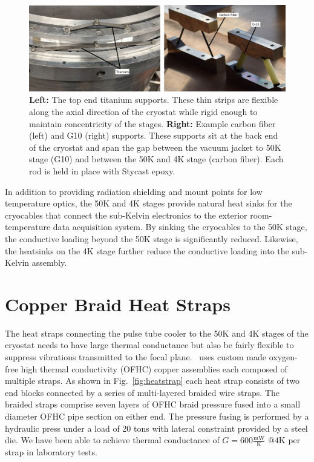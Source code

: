 \documentclass[]{spie}  %
\begin{document}
\begin{figure}[b]
	\center
	\includegraphics{supports.png}
	\caption{\textbf{Left:} The top end titanium supports. These thin strips
	are flexible along the axial direction of the cryostat while rigid enough
	to maintain concentricity of the stages. \textbf{Right:} Example carbon fiber (left) and G10 (right) supports. These
	supports sit at the back end of the cryostat and span the gap between the
	vacuum jacket to 50K stage (G10) and between the 50K and 4K stage (carbon
	fiber). Each rod is held in place with Stycast epoxy.}
	\label{fig:supports}
\end{figure}



In addition to providing radiation shielding and mount points for low
temperature optics, the 50K and 4K stages provide natural heat sinks for the
cryocables that connect the sub-Kelvin electronics to the exterior
room-temperature data acquisition system. By sinking the cryocables to the 50K
stage, the conductive loading beyond the 50K stage is significantly reduced.
Likewise, the heatsinks on the 4K stage further reduce the conductive
loading into the sub-Kelvin assembly.



\section{Copper Braid Heat Straps}

The heat straps connecting the pulse tube cooler to the 50K and 4K stages of
the cryostat needs to have large thermal conductance but also be fairly
flexible to suppress vibrations transmitted to the focal plane. \biceparray\ 
uses custom made oxygen-free high thermal conductivity (OFHC) copper
assemblies each composed of multiple straps. As shown
in Fig.~\ref{fig:heatstrap} each heat strap consists of two end blocks
connected by a series of multi-layered braided wire straps. The braided straps
comprise seven layers of OFHC braid pressure fused into a small diameter OFHC
pipe section on either end. The pressure fusing is performed by a hydraulic
press under a load of 20 tons with lateral constraint provided by a steel
die. We have been able to achieve thermal conductance of $G=600
\frac{\text{mW}}{\text{K}} \text{  @}4\text{K}$ per strap in laboratory tests.
\end{document}
